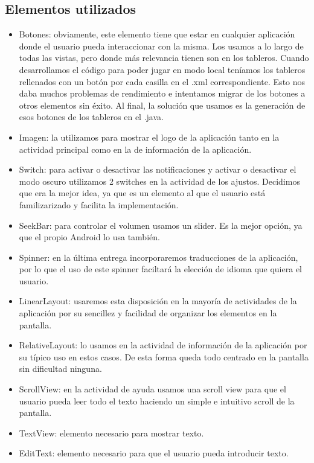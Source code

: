 \documentclass[a4paper, openright, 12pt]{article}
\begin{document}
\subsection{Elementos utilizados}
\begin{itemize}
    \item Botones: obviamente, este elemento tiene que estar en cualquier aplicación donde el usuario pueda interaccionar con la misma. Los usamos a lo largo de todas las vistas, pero donde más relevancia tienen son en los tableros. Cuando desarrollamos el código para poder jugar en modo local teníamos los tableros rellenados con un botón por cada casilla en el .xml correspondiente. Esto nos daba muchos problemas de rendimiento e intentamos migrar de los botones a otros elementos sin éxito. Al final, la solución que usamos es la generación de esos botones de los tableros en el .java.
    \item Imagen: la utilizamos para mostrar el logo de la aplicación tanto en la actividad principal como en la de información de la aplicación.
    \item Switch: para activar o desactivar las notificaciones y activar o desactivar el modo oscuro utilizamos 2 switches en la actividad de los ajustos. Decidimos que era la mejor idea, ya que es un elemento al que el usuario está familizarizado y facilita la implementación.
    \item SeekBar: para controlar el volumen usamos un slider. Es la mejor opción, ya que el propio Android lo usa también.
    \item Spinner: en la última entrega incorporaremos traducciones de la aplicación, por lo que el uso de este spinner faciltará la elección de idioma que quiera el usuario.
    \item LinearLayout: usaremos esta disposición en la mayoría de actividades de la aplicación por su sencillez y facilidad de organizar los elementos en la pantalla.
    \item RelativeLayout: lo usamos en la actividad de información de la aplicación por su típico uso en estos casos. De esta forma queda todo centrado en la pantalla sin dificultad ninguna.
    \item ScrollView: en la actividad de ayuda usamos una scroll view para que el usuario pueda leer todo el texto haciendo un simple e intuitivo scroll de la pantalla.
    \item TextView: elemento necesario para mostrar texto.
    \item EditText: elemento necesario para que el usuario pueda introducir texto.
\end{itemize}
\end{document}
